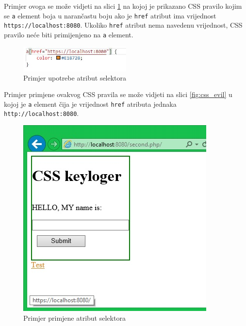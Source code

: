\documentclass[12pt, oneside, onecolumn]{book}
\begin{document}
{ Primjer ovoga se može vidjeti na slici \ref{fig:css_as} na kojoj je prikazano CSS pravilo kojim se \texttt{a} element boja u narančastu boju ako je \texttt{href} atribut ima vrijednost \texttt{https://localhost:8080}. Ukoliko \texttt{href} atribut nema navedenu vrijednost, CSS pravilo neće biti primijenjeno na \texttt{a} element.

\begin{figure}[H]
	\begin{center}
		\includegraphics[width=0.5\textwidth]{css_as.jpg}
		\caption{Primjer upotrebe atribut selektora} \label{fig:css_as}
	\end{center}
\end{figure}

Primjer primjene ovakvog CSS pravila se može vidjeti na slici \ref{fig:css_evil} u kojoj je \texttt{a} element čija je vrijednost \texttt{href} atributa jednaka \texttt{http://localhost:8080}.

\begin{figure}[H]
	\begin{center}
		\includegraphics[width=\textwidth]{css_ex.jpg}
		\caption{Primjer primjene atribut selektora} \label{fig:css_ex}
	\end{center}
\end{figure}

}
\end{document}
